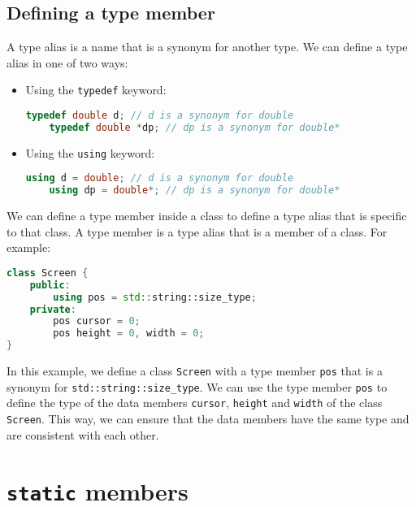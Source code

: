 \subsection{Defining a type member}

A type alias is a name that is a synonym for another type. We can define a type alias in one of 
two ways:

\begin{itemize}
    \item Using the \texttt{typedef} keyword:
    
    \begin{lstlisting}[language=C++]
    typedef double d; // d is a synonym for double
    typedef double *dp; // dp is a synonym for double*
    \end{lstlisting}

    \item Using the \texttt{using} keyword:
    
    \begin{lstlisting}[language=C++]
    using d = double; // d is a synonym for double
    using dp = double*; // dp is a synonym for double*
    \end{lstlisting}

\end{itemize}

We can define a type member inside a class to define a type alias that is specific to that class.
A type member is a type alias that is a member of a class. For example:\\

\begin{lstlisting}[language=C++]
class Screen {
    public:
        using pos = std::string::size_type;
    private:
        pos cursor = 0;
        pos height = 0, width = 0;
}
\end{lstlisting}

In this example, we define a class \texttt{Screen} with a type member \texttt{pos} that is a synonym
for \texttt{std::string::size\_type}. We can use the type member \texttt{pos} to define the type of
the data members \texttt{cursor}, \texttt{height} and \texttt{width} of the class \texttt{Screen}.
This way, we can ensure that the data members have the same type and are consistent with each other.


\section{\texttt{static} members}

